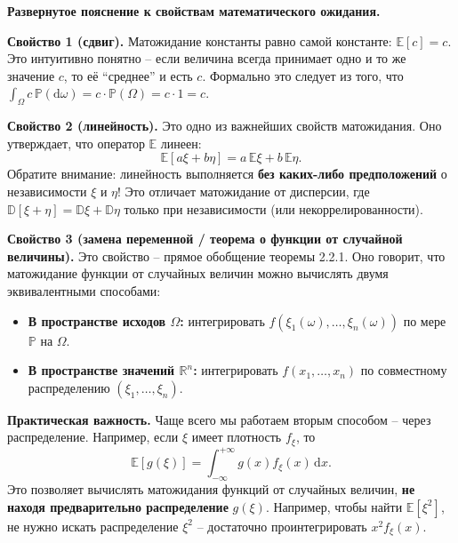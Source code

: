 \begin{notice}
\textbf{Развернутое пояснение к свойствам математического ожидания.}

\textbf{Свойство 1 (сдвиг).} Матожидание константы равно самой константе: $\mathbb{E}[c] = c$. Это интуитивно понятно -- если величина всегда принимает одно и то же значение $c$, то её ``среднее'' и есть $c$. Формально это следует из того, что $\int_{\Omega} c \, \mathbb{P}(\mathrm{d}\omega) = c \cdot \mathbb{P}(\Omega) = c \cdot 1 = c$.

\textbf{Свойство 2 (линейность).} Это одно из важнейших свойств матожидания. Оно утверждает, что оператор $\mathbb{E}$ линеен:
\[
\mathbb{E}[a\xi + b\eta] = a\,\mathbb{E}\xi + b\,\mathbb{E}\eta.
\]
Обратите внимание: линейность выполняется \textbf{без каких-либо предположений} о независимости $\xi$ и $\eta$! Это отличает матожидание от дисперсии, где $\mathbb{D}[\xi + \eta] = \mathbb{D}\xi + \mathbb{D}\eta$ только при независимости (или некоррелированности).

\textbf{Свойство 3 (замена переменной / теорема о функции от случайной величины).} Это свойство -- прямое обобщение теоремы 2.2.1. Оно говорит, что матожидание функции от случайных величин можно вычислять двумя эквивалентными способами:
\begin{itemize}
    \item \textbf{В пространстве исходов $\Omega$:} интегрировать $f(\xi_1(\omega), \ldots, \xi_n(\omega))$ по мере $\mathbb{P}$ на $\Omega$.
    \item \textbf{В пространстве значений $\mathbb{R}^n$:} интегрировать $f(x_1, \ldots, x_n)$ по совместному распределению $(\xi_1, \ldots, \xi_n)$.
\end{itemize}

\textbf{Практическая важность.} Чаще всего мы работаем вторым способом -- через распределение. Например, если $\xi$ имеет плотность $f_{\xi}$, то
\[
\mathbb{E}[g(\xi)] = \int_{-\infty}^{+\infty} g(x) f_{\xi}(x) \, \mathrm{d}x.
\]
Это позволяет вычислять матожидания функций от случайных величин, \textbf{не находя предварительно распределение} $g(\xi)$. Например, чтобы найти $\mathbb{E}[\xi^2]$, не нужно искать распределение $\xi^2$ -- достаточно проинтегрировать $x^2 f_{\xi}(x)$.
\end{notice}
